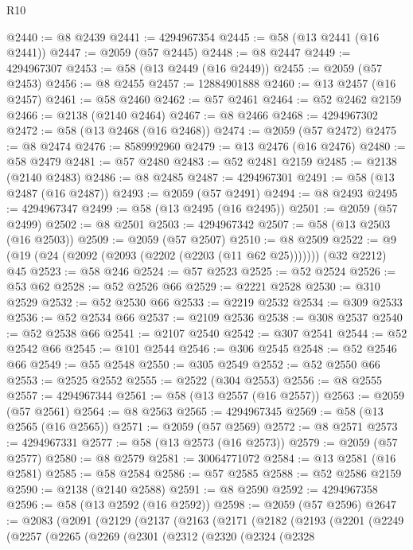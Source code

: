\begin{lexlean}{R10}
\begin{coremodule}
@2440 := @8 @2439
@2441 := 4294967354
@2445 := @58 (@13 @2441 (@16 @2441))
@2447 := @2059 (@57 @2445)
@2448 := @8 @2447
@2449 := 4294967307
@2453 := @58 (@13 @2449 (@16 @2449))
@2455 := @2059 (@57 @2453)
@2456 := @8 @2455
@2457 := 12884901888
@2460 := @13 @2457 (@16 @2457)
@2461 := @58 @2460
@2462 := @57 @2461
@2464 := @52 @2462 @2159
@2466 := @2138 (@2140 @2464)
@2467 := @8 @2466
@2468 := 4294967302
@2472 := @58 (@13 @2468 (@16 @2468))
@2474 := @2059 (@57 @2472)
@2475 := @8 @2474
@2476 := 8589992960
@2479 := @13 @2476 (@16 @2476)
@2480 := @58 @2479
@2481 := @57 @2480
@2483 := @52 @2481 @2159
@2485 := @2138 (@2140 @2483)
@2486 := @8 @2485
@2487 := 4294967301
@2491 := @58 (@13 @2487 (@16 @2487))
@2493 := @2059 (@57 @2491)
@2494 := @8 @2493
@2495 := 4294967347
@2499 := @58 (@13 @2495 (@16 @2495))
@2501 := @2059 (@57 @2499)
@2502 := @8 @2501
@2503 := 4294967342
@2507 := @58 (@13 @2503 (@16 @2503))
@2509 := @2059 (@57 @2507)
@2510 := @8 @2509
@2522 := @9 (@19 (@24 (@2092 (@2093 (@2202 (@2203 (@11 @62 @25))))))) (@32 @2212) @45
@2523 := @58 @246
@2524 := @57 @2523
@2525 := @52 @2524
@2526 := @53 @62
@2528 := @52 @2526 @66
@2529 := @2221 @2528
@2530 := @310 @2529
@2532 := @52 @2530 @66
@2533 := @2219 @2532
@2534 := @309 @2533
@2536 := @52 @2534 @66
@2537 := @2109 @2536
@2538 := @308 @2537
@2540 := @52 @2538 @66
@2541 := @2107 @2540
@2542 := @307 @2541
@2544 := @52 @2542 @66
@2545 := @101 @2544
@2546 := @306 @2545
@2548 := @52 @2546 @66
@2549 := @55 @2548
@2550 := @305 @2549
@2552 := @52 @2550 @66
@2553 := @2525 @2552
@2555 := @2522 (@304 @2553)
@2556 := @8 @2555
@2557 := 4294967344
@2561 := @58 (@13 @2557 (@16 @2557))
@2563 := @2059 (@57 @2561)
@2564 := @8 @2563
@2565 := 4294967345
@2569 := @58 (@13 @2565 (@16 @2565))
@2571 := @2059 (@57 @2569)
@2572 := @8 @2571
@2573 := 4294967331
@2577 := @58 (@13 @2573 (@16 @2573))
@2579 := @2059 (@57 @2577)
@2580 := @8 @2579
@2581 := 30064771072
@2584 := @13 @2581 (@16 @2581)
@2585 := @58 @2584
@2586 := @57 @2585
@2588 := @52 @2586 @2159
@2590 := @2138 (@2140 @2588)
@2591 := @8 @2590
@2592 := 4294967358
@2596 := @58 (@13 @2592 (@16 @2592))
@2598 := @2059 (@57 @2596)
@2647 := @2083
    (@2091
      (@2129
        (@2137
          (@2163
            (@2171
              (@2182
                (@2193
                  (@2201
                    (@2249
                      (@2257
                        (@2265
                          (@2269
                            (@2301
                              (@2312
                                (@2320
                                  (@2324
                                    (@2328

\end{coremodule}
\end{lexlean}
